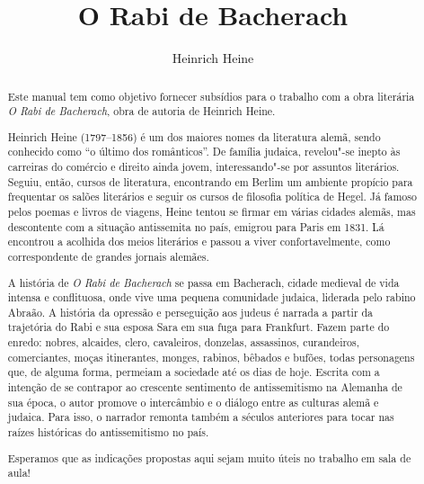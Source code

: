 \documentclass[12pt]{extarticle}
\begin{document}
\newcommand{\AutorLivro}{Heinrich Heine}
\newcommand{\TituloLivro}{O Rabi de Bacherach}
\newcommand{\Tema}{Ficção, mistério e fantasia}
\newcommand{\Genero}{Romance}
\newcommand{\imagemCapa}{./images/PNLD0018-01.png}
\newcommand{\issnppub}{---}
\newcommand{\issnepub}{---}
\newcommand{\colaborador}{{Michelle Etienne Florence, Bruno Gradella e Vicente Castro}}


\title{\TituloLivro}
\author{\AutorLivro}
\def\authornotes{\colaborador}

\date{}
\maketitle

\baselineskip\par

\begin{abstract}

Este manual tem como objetivo fornecer subsídios para o trabalho com a
obra literária \emph{O Rabi de Bacherach}, obra de autoria de Heinrich
Heine.

Heinrich Heine (1797--1856) é um dos maiores nomes da literatura alemã,
sendo conhecido como ``o último dos românticos''.
De família judaica, revelou"-se inepto às carreiras do comércio e direito ainda 
jovem, interessando"-se por assuntos literários. Seguiu, então, cursos de 
literatura, encontrando em Berlim um ambiente propício para frequentar os salões 
literários e seguir os cursos de filosofia política de Hegel.
Já famoso pelos poemas e livros de viagens, Heine tentou se firmar em várias
cidades alemãs, mas descontente com a situação antissemita no país, emigrou
para Paris em 1831. Lá encontrou a acolhida dos meios literários e passou a
viver confortavelmente, como correspondente de grandes jornais alemães.

A história de \textit{O Rabi de Bacherach} se passa em Bacherach, cidade medieval 
de vida intensa e conflituosa, onde vive uma pequena comunidade judaica, liderada pelo
rabino Abraão. A história da opressão e perseguição aos judeus é narrada a
partir da trajetória do Rabi e sua esposa Sara em sua fuga para Frankfurt.
Fazem parte do enredo: nobres, alcaides, clero, cavaleiros, donzelas, assassinos, 
curandeiros, comerciantes, moças itinerantes, monges, rabinos, bêbados e bufões, 
todas personagens que, de alguma forma, permeiam a sociedade até os dias de hoje.
Escrita com a intenção de se contrapor ao crescente sentimento de antissemitismo
na Alemanha de sua época, o autor promove o intercâmbio e o diálogo entre as culturas 
alemã e judaica. Para isso, o narrador remonta também a séculos anteriores para tocar 
nas raízes históricas do antissemitismo no país.

Esperamos que as indicações propostas aqui sejam muito úteis no trabalho em
sala de aula! 


\end{abstract}
\end{document}
